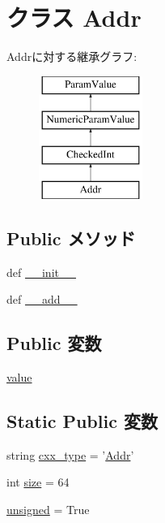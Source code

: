 \hypertarget{classm5_1_1params_1_1Addr}{
\section{クラス Addr}
\label{classm5_1_1params_1_1Addr}
}
Addrに対する継承グラフ:\begin{figure}[H]
\begin{center}
\leavevmode
\includegraphics[height=4cm]{classm5_1_1params_1_1Addr}
\end{center}
\end{figure}
\subsection*{Public メソッド}
\begin{DoxyCompactItemize}
\item 
def \hyperlink{classm5_1_1params_1_1Addr_ac775ee34451fdfa742b318538164070e}{\_\-\_\-init\_\-\_\-}
\item 
def \hyperlink{classm5_1_1params_1_1Addr_ae92943b217d29a45ddcbbba2f7208afc}{\_\-\_\-add\_\-\_\-}
\end{DoxyCompactItemize}
\subsection*{Public 変数}
\begin{DoxyCompactItemize}
\item 
\hyperlink{classm5_1_1params_1_1Addr_afcc7a4b78ecd8fa7e713f8cfa0f51017}{value}
\end{DoxyCompactItemize}
\subsection*{Static Public 変数}
\begin{DoxyCompactItemize}
\item 
string \hyperlink{classm5_1_1params_1_1Addr_a2f1553ebb79374a68b36fdd6d8d82fc3}{cxx\_\-type} = '\hyperlink{classm5_1_1params_1_1Addr}{Addr}'
\item 
int \hyperlink{classm5_1_1params_1_1Addr_a439227feff9d7f55384e8780cfc2eb82}{size} = 64
\item 
\hyperlink{classm5_1_1params_1_1Addr_aca40206900cfc164654362fa8d4ad1e6}{unsigned} = True
\end{DoxyCompactItemize}


